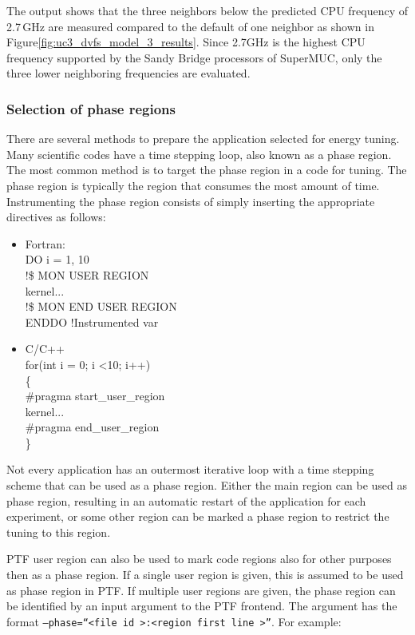The output shows that the three neighbors below the predicted CPU frequency of 2.7\,GHz are measured compared to the default of one neighbor as shown in Figure\ref{fig:uc3_dvfs_model_3_results}. Since 2.7GHz is the highest CPU frequency supported by the Sandy Bridge processors of SuperMUC, only the three lower neighboring frequencies are evaluated. 

\subsubsection{Selection of phase regions}

There are several methods to prepare the application selected for energy tuning. Many scientific codes have a time stepping loop, also known as a phase region. The most common method is to target the phase region in a code for tuning. The phase region is typically the region that consumes the most amount of time. Instrumenting the phase region consists of simply inserting the appropriate directives as follows:

\begin{itemize}
		\item Fortran: \\
		DO i = 1, 10 \\
		!\$ MON USER REGION \\
		kernel... \\
		!\$ MON END USER REGION \\
		ENDDO !Instrumented var \\
		\item C/C++ \\
		for(int i = 0; i \textless 10; i++) \\
		\{ \\
		\#pragma start\_user\_region \\
		kernel... \\
		\#pragma end\_user\_region \\
		\} \\		
\end{itemize}

Not every application has an outermost iterative loop with a time stepping scheme that can be used as a phase region. Either the main region can be used as phase region, resulting in an automatic restart of the application for each experiment, or some other region can be marked a phase region to restrict the tuning to this region. 

PTF user region can also be used to mark code regions also for other purposes then as a phase region. If a single user region is given, this is assumed to be used as phase region in PTF. If multiple user regions are given, the phase region can be identified by an input argument to the PTF frontend. The argument has the format {\tt--phase=``\textless file id \textgreater:\textless region first line \textgreater ''}. For example: 

